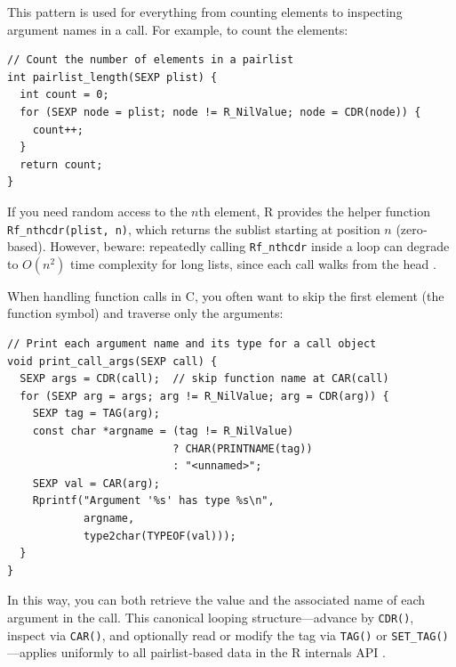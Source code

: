 This pattern is used for everything from counting elements to inspecting argument names in a call.  For example, to count the elements:

\begin{verbatim}
// Count the number of elements in a pairlist
int pairlist_length(SEXP plist) {
  int count = 0;
  for (SEXP node = plist; node != R_NilValue; node = CDR(node)) {
    count++;
  }
  return count;
}
\end{verbatim}

If you need random access to the \(n\)th element, R provides the helper function \texttt{Rf\_nthcdr(plist, n)}, which returns the sublist starting at position \(n\) (zero‐based).  However, beware: repeatedly calling \texttt{Rf\_nthcdr} inside a loop can degrade to \(O(n^2)\) time complexity for long lists, since each call walks from the head \cite{wickham_pairlists}.  

When handling function calls in C, you often want to skip the first element (the function symbol) and traverse only the arguments:

\begin{verbatim}
// Print each argument name and its type for a call object
void print_call_args(SEXP call) {
  SEXP args = CDR(call);  // skip function name at CAR(call)
  for (SEXP arg = args; arg != R_NilValue; arg = CDR(arg)) {
    SEXP tag = TAG(arg);
    const char *argname = (tag != R_NilValue)
                          ? CHAR(PRINTNAME(tag))
                          : "<unnamed>";
    SEXP val = CAR(arg);
    Rprintf("Argument '%s' has type %s\n",
            argname,
            type2char(TYPEOF(val)));
  }
}
\end{verbatim}

In this way, you can both retrieve the value and the associated name of each argument in the call.  This canonical looping structure—advance by \texttt{CDR()}, inspect via \texttt{CAR()}, and optionally read or modify the tag via \texttt{TAG()} or \texttt{SET\_TAG()}—applies uniformly to all pairlist‐based data in the R internals API \cite{wickham_pairlists}.

